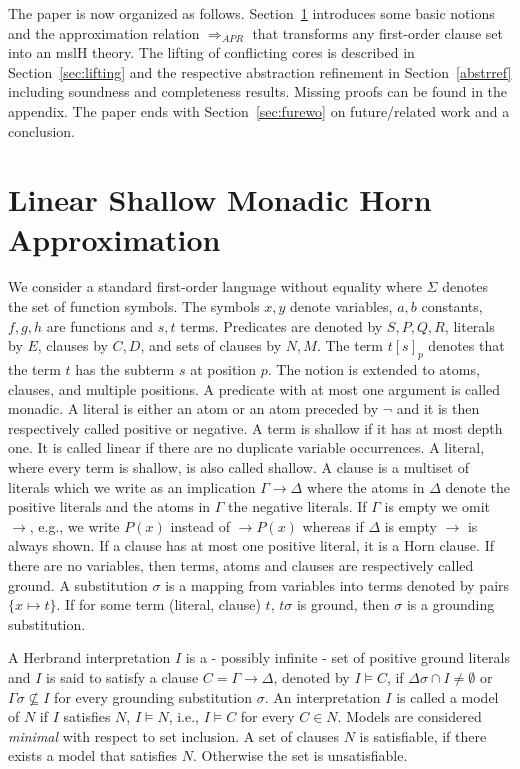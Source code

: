 \documentclass{llncs}
\newcommand{\sat}{\vDash}
\newcommand{\imp}{\rightarrow}
\newcommand{\apr}{ \Rightarrow_{APR}}
\begin{document}
The paper is now organized as follows. Section~\ref{sec:abstr} introduces some basic notions and the approximation relation $\apr$
that transforms any first-order clause set into an mslH theory.
The lifting of conflicting cores is described in Section~\ref{sec:lifting} and the respective abstraction refinement
in Section~\ref{abstrref} including soundness and completeness results. Missing proofs can be found in the appendix.
The paper ends with Section~\ref{sec:furewo} on future/related work and a conclusion.

  
\section{Linear Shallow Monadic Horn Approximation} \label{sec:abstr}

We consider a standard first-order language without equality where $\Sigma$ 
denotes the set of function symbols.
The symbols $x,y$ denote variables, $a,b$ constants, 
$f,g,h$ are functions and $s,t$ terms. 
Predicates are denoted by $S,P,Q,R$, literals by $E$, clauses by $C,D$, and sets of clauses by  $N,M$.
The term $t[s]_p$ denotes that the term $t$ has the subterm $s$ at position $p$. 
The notion is extended to atoms, clauses, and multiple positions.
A predicate with at most one argument is called monadic.
A literal is either an atom or an atom preceded by $\neg$ and it is then respectively  called positive or negative.
A term is shallow if it has at most depth one. 
It is called linear if there are no duplicate variable occurrences. 
A literal, where every term is shallow, is also called shallow. 
A clause is a multiset of literals which we write as an implication $\Gamma \imp \Delta$ where the atoms in $\Delta$ denote the positive literals
and the atoms in $\Gamma$ the negative literals.
If $\Gamma$ is empty we omit $\imp$, e.g., we write $P(x)$ instead of $\imp P(x)$ whereas if
$\Delta$ is empty $\imp$ is always shown.
If a clause has at most one positive literal, it is a Horn clause.
If there are no variables, then terms, atoms and clauses are respectively called ground.
A substitution $\sigma$ is a mapping from variables into terms denoted by pairs $\{x \mapsto t\}$.
If for some term (literal, clause) $t$, $t\sigma$ is ground, then $\sigma$ is a grounding substitution.


A Herbrand interpretation $I$ is a - possibly infinite - set of positive ground literals and $I$ is said to satisfy a 
clause $C= \Gamma \imp \Delta$, denoted by $I\sat C$, if  $\Delta\sigma \cap I \neq \emptyset$ or $\Gamma\sigma \not\subseteq I$ for every grounding substitution $\sigma$.
An interpretation $I$ is called a model of $N$ if $I$ satisfies $N$, $I\sat N$, i.e., 
$I\sat C$ for every $C\in N$. Models are considered \emph{minimal} with respect to set inclusion.
A set of clauses $N$ is satisfiable, if there exists a model that satisfies $N$. Otherwise the set is unsatisfiable.
\end{document}
